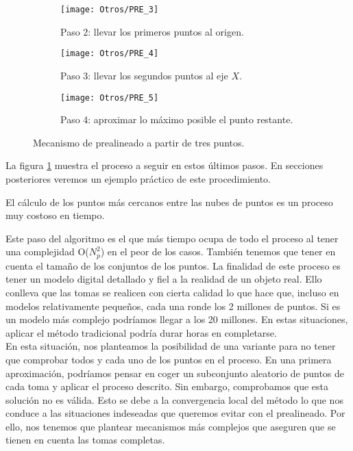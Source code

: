 \begin{figure}[h!]
	\begin{subfigure}{0.5\textwidth}
		\centering
		\texttt{[image: Otros/PRE\_3]}
		\caption{Paso 2: llevar los primeros puntos al origen.}
	\end{subfigure}
	\begin{subfigure}{0.5\textwidth}
		\centering
		\texttt{[image: Otros/PRE\_4]}
		\caption{Paso 3: llevar los segundos puntos al eje $ X $.}
	\end{subfigure}
	\begin{center}
		\begin{subfigure}{0.5\textwidth}
			\texttt{[image: Otros/PRE\_5]}
			\caption{Paso 4: aproximar lo máximo posible el punto restante.}
		\end{subfigure}
	\end{center}		
	\caption{Mecanismo de prealineado a partir de tres puntos.}
	\label{fig:ex-pre2}
\end{figure}


La figura \ref{fig:ex-pre2} muestra el proceso a seguir en estos últimos pasos. En secciones posteriores veremos un ejemplo práctico de este procedimiento.

\bigskip 
\begin{observacion}\label{ObsTmp}
El cálculo de los puntos más cercanos entre las nubes de puntos es un proceso muy costoso en tiempo.
\end{observacion}
Este paso del algoritmo es el que más tiempo ocupa de todo el proceso al tener una complejidad O($ N_p^2 $) en el peor de los casos. También tenemos que tener en cuenta el tamaño de los conjuntos de los puntos. La finalidad de este proceso es tener un modelo digital detallado y fiel a la realidad de un objeto real. Ello conlleva que las tomas se realicen con cierta calidad lo que hace que, incluso en modelos relativamente pequeños, cada una ronde los 2 millones de puntos. Si es un modelo más complejo podríamos llegar a los 20 millones. En estas situaciones, aplicar el método tradicional podría durar horas en completarse. \\

En esta situación, nos planteamos la posibilidad de una variante para no tener que comprobar todos y cada uno de los puntos en el proceso. En una primera aproximación, podríamos pensar en coger un subconjunto aleatorio de puntos de cada toma y aplicar el proceso descrito. Sin embargo,  comprobamos que esta solución no es válida. Esto se debe a la convergencia local del método lo que nos conduce a las situaciones indeseadas que queremos evitar con el prealineado. Por ello, nos tenemos que plantear mecanismos más complejos que aseguren que se tienen en cuenta las tomas completas. \\

